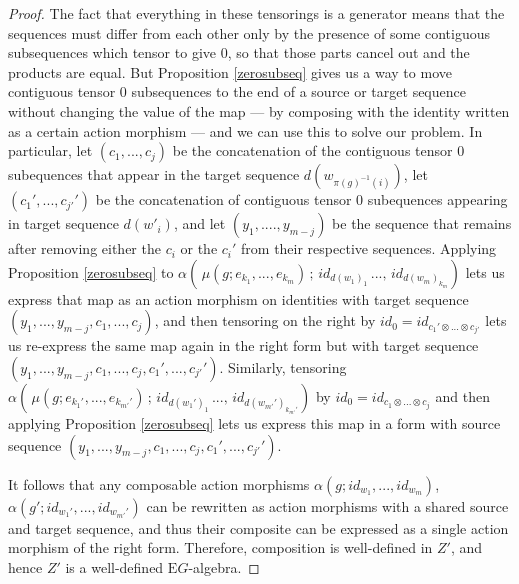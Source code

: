 \documentclass{amsart} %
\begin{document}
\begin{proof}
The fact that everything in these tensorings is a generator means that the sequences must differ from each other only by the presence of some contiguous subsequences which tensor to give 0, so that those parts cancel out and the products are equal. But Proposition \ref{zerosubseq} gives us a way to move contiguous tensor 0 subsequences to the end of a source or target sequence without changing the value of the map --- by composing with the identity written as a certain action morphism --- and we can use this to solve our problem. In particular, let $(c_1, ..., c_j)$ be the concatenation of the contiguous tensor 0 subequences that appear in the target sequence $d(w_{\pi(g)^{-1}(i)})$, let $(c_1', ..., c_{j'}')$ be the concatenation of contiguous tensor 0 subequences appearing in target sequence $d(w'_i)$, and let $(y_1, ...., y_{m-j})$ be the sequence that remains after removing either the $c_i$ or the $c_i'$ from their respective sequences. Applying Proposition \ref{zerosubseq} to $\alpha( \, \mu(g; e_{k_1}, ..., e_{k_m}) \, ; \, id_{d(w_1)_1} \, ..., \, id_{d(w_m)_{k_m}})$ lets us express that map as an action morphism on identities with target sequence $(y_1, ..., y_{m-j}, c_1, ..., c_j)$, and then tensoring on the right by $id_0 = id_{c_1' \otimes ... \otimes c_{j'}}$ lets us re-express the same map again in the right form but with target sequence $(y_1, ..., y_{m-j}, c_1, ..., c_j, c_1', ..., c_{j'}')$. Similarly, tensoring $\alpha( \, \mu(g; e_{k_1'}, ..., e_{k_{m'}'}) \, ; \, id_{d(w_1')_1} \, ..., \, id_{d(w_{m'}')_{k_{m'}'}} )$ by $id_0 = id_{c_1 \otimes ... \otimes c_j}$ and then applying Proposition \ref{zerosubseq} lets us express this map in a form with source sequence $(y_1, ..., y_{m-j}, c_1, ..., c_j, c_1', ..., c_{j'}')$. 

It follows that any composable action morphisms $\alpha(g; id_{w_1}, ..., id_{w_m})$, $\alpha(g'; id_{w_1'}, ..., id_{w_{m'}'})$ can be rewritten as action morphisms with a shared source and target sequence, and thus their composite can be expressed as a single action morphism of the right form. Therefore, composition is well-defined in $Z'$, and hence $Z'$ is a well-defined $\mathrm{E}G$-algebra.


\end{proof}
\end{document}
